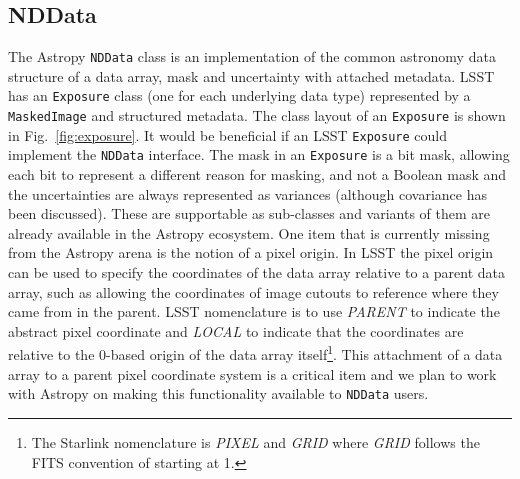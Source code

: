 \documentclass[]{spie}  %
\begin{document}
\subsection{NDData}

The Astropy \texttt{NDData} class is an implementation of the common astronomy data structure\cite{2015A&C....12..146J} of a data array, mask and uncertainty with attached metadata.
LSST has an \texttt{Exposure} class (one for each underlying data type) represented by a \texttt{MaskedImage} and structured metadata.
The class layout of an \texttt{Exposure} is shown in Fig.~\ref{fig:exposure}.
It would be beneficial if an LSST \texttt{Exposure} could implement the \texttt{NDData} interface.
The mask in an \texttt{Exposure} is a bit mask, allowing each bit to represent a different reason for masking, and not a Boolean mask and the uncertainties are always represented as variances (although covariance has been discussed).
These are supportable as sub-classes and variants of them are already available in the Astropy ecosystem.
One item that is currently missing from the Astropy arena is the notion of a pixel origin.
In LSST the pixel origin can be used to specify the coordinates of the data array relative to a parent data array, such as allowing the coordinates of image cutouts to reference where they came from in the parent.
LSST nomenclature is to use \emph{PARENT} to indicate the abstract pixel coordinate and \emph{LOCAL} to indicate that the coordinates are relative to the 0-based origin of the data array itself\footnote{The Starlink nomenclature\cite{2015A&C....12..146J} is \emph{PIXEL} and \emph{GRID} where \emph{GRID} follows the FITS convention of starting at 1.}.
This attachment of a data array to a parent pixel coordinate system is a critical item and we plan to work with Astropy on making this functionality available to \texttt{NDData} users.
\end{document}
